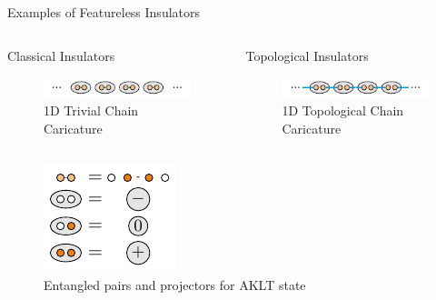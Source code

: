 \begin{frame}{Examples of Featureless Insulators}
\vskip-1.5cm		
\begin{columns}[T]
	\begin{column}[T]{.5\textwidth}
		\begin{block}{Classical Insulators}
			\vskip0.55cm
			\begin{figure}
				\includegraphics[width=\linewidth] {diagrams/haldane_insulator_chain_trivial.pdf}
				\caption{1D Trivial Chain Caricature}
			\end{figure}
		\end{block}
	\end{column}
	\begin{column}[T]{.5\textwidth}
		\begin{block}{Topological Insulators}
			\vskip0.45cm
			\begin{figure}
				\includegraphics[width=\linewidth] {diagrams/haldane_insulator_chain.pdf}
				\caption{1D Topological Chain Caricature}
			\end{figure}
		\end{block}
	\end{column}
\end{columns}
\begin{center}
	\begin{figure}[]
		\includegraphics[width=0.4\textheight] {diagrams/aklt_rules.pdf}
		\caption{Entangled pairs and projectors for AKLT state}
	\end{figure}
\end{center}
\end{frame}

